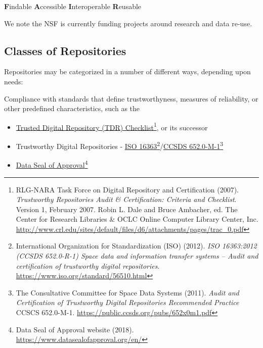 \documentclass[letterpaper,twoside,11pt]{scrartcl}
\providecommand{\tightlist}{%
  \setlength{\itemsep}{0pt}\setlength{\parskip}{0pt}}
\begin{document}
\begin{multicols}{2}
\textbf{F}indable \textbf{A}ccessible \textbf{I}nteroperable
\textbf{R}eusable

We note the NSF is currently funding projects around research and data
re-use.

\subsection{Classes of Repositories}\label{classes-of-repositories}

Repositories may be categorized in a number of different ways, depending
upon needs:

Compliance with standards that define trustworthyness, measures of
reliability, or other predefined characteristics, such as the

\begin{itemize}
\tightlist
\item
  \href{http://www.crl.edu/sites/default/files/d6/attachments/pages/trac_0.pdf}{Trusted
  Digital Repository (TDR) Checklist}\footnote{RLG-NARA Task Force on
    Digital Repository and Certification (2007). \emph{Trustworthy
    Repositories Audit \& Certification: Criteria and Checklist}.
    Version 1, February 2007. Robin L. Dale and Bruce Ambacher, ed. The
    Center for Research Libraries \& OCLC Online Computer Library
    Center, Inc.
    \url{http://www.crl.edu/sites/default/files/d6/attachments/pages/trac_0.pdf}},
  or its successor
\item
  Trustworthy Digital Repositories -
  \href{https://www.iso.org/standard/56510.html}{ISO 16363}\footnote{International
    Organization for Standardization (ISO) (2012). \emph{ISO 16363:2012
    (CCSDS 652.0-R-1) Space data and information transfer systems --
    Audit and certification of trustworthy digital repositories}.
    \url{https://www.iso.org/standard/56510.html}}/\href{https://public.ccsds.org/pubs/652x0m1.pdf}{CCSDS
  652.0-M-1}\footnote{The Consultative Committee for Space Data Systems
    (2011). \emph{Audit and Certification of Trustworthy Digital
    Repositories Recommended Practice} CCSCS 652.0-M-1.
    \url{https://public.ccsds.org/pubs/652x0m1.pdf}}
\item
  \href{https://www.datasealofapproval.org/en/}{Data Seal of
  Approval}\footnote{Data Seal of Approval website (2018).
    \url{https://www.datasealofapproval.org/en/}}
\end{itemize}


\end{multicols}
\end{document}
